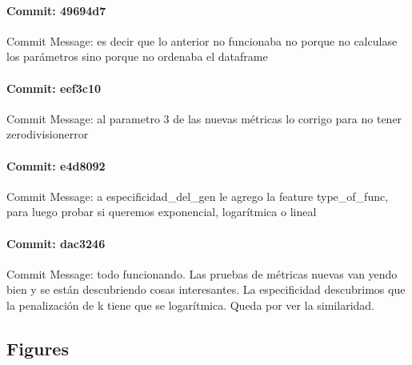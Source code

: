 \documentclass{article}
\begin{document}
\paragraph{Commit: 49694d7}
Commit Message: es decir que lo anterior no funcionaba no porque no calculase los parámetros sino porque no ordenaba el dataframe

\paragraph{Commit: eef3c10}
Commit Message: al parametro 3 de las nuevas métricas lo corrigo para no tener zerodivisionerror

\paragraph{Commit: e4d8092}
Commit Message: a especificidad_del_gen le agrego la feature type_of_func, para luego probar si queremos exponencial, logarítmica o lineal

\paragraph{Commit: dac3246}
Commit Message: todo funcionando. Las pruebas de métricas nuevas van yendo bien y se están descubriendo cosas interesantes. La especificidad descubrimos que la penalización de k tiene que se logarítmica. Queda por ver la similaridad.

\subsection{Figures}
\end{document}
